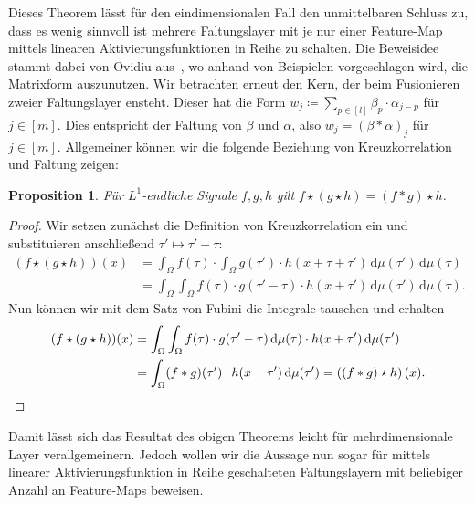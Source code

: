 \documentclass[paper=a4, 	%
		fontsize=11pt, 		%
		abstracton, 	%
		headsepline, 	%
		notitlepage	%
		]{scrartcl}
\newtheorem{proposition}[theorem]{Proposition}
\theoremstyle{definition}
\newcommand{\diff}{\,\textrm{d}}
\newcommand{\fNat}[1]{[ #1 ]}
\begin{document}
Dieses Theorem lässt für den eindimensionalen Fall den unmittelbaren Schluss zu, dass es wenig sinnvoll ist mehrere Faltungslayer mit je nur einer Feature-Map mittels linearen Aktivierungsfunktionen in Reihe zu schalten.
Die Beweisidee stammt dabei von Ovidiu aus~\cite{Calin2020}, wo anhand von Beispielen vorgeschlagen wird, die Matrixform auszunutzen.
Wir betrachten erneut den Kern, der beim Fusionieren zweier Faltungslayer ensteht.
Dieser hat die Form $w_j \coloneqq \sum_{p\in\fNat{l}} \beta_p \cdot \alpha_{j-p}$ für $j\in\fNat{m}$.
Dies entspricht der Faltung von $\beta$ und $\alpha$, also $w_j = (\beta * \alpha)_j$ für $j\in\fNat{m}$.
Allgemeiner können wir die folgende Beziehung von Kreuzkorrelation und Faltung zeigen:
\begin{proposition}\label{prop:associativity-cross-corr}
    Für $L^1$-endliche Signale $f,g,h$ gilt $f\star (g \star h) = (f*g)\star h$.
\end{proposition}
\begin{proof}
    Wir setzen zunächst die Definition von Kreuzkorrelation ein und substituieren anschließend $\tau' \mapsto \tau' - \tau$:
    \begin{align*}
        (f\star (g\star h))(x)
        &= \int_\Omega f(\tau) \cdot \int_\Omega g(\tau') \cdot h(x+\tau+\tau')\diff\mu(\tau') \diff \mu(\tau) \\
        &= \int_\Omega \int_\Omega f(\tau) \cdot g(\tau' - \tau)\cdot h(x+\tau')\diff\mu(\tau') \diff \mu(\tau).
    \end{align*}
    Nun können wir mit dem Satz von Fubini die Integrale tauschen und erhalten
    \begin{align*}
        (f\star (g\star h))(x)&= \int_\Omega\int_\Omega f(\tau) \cdot g(\tau'-\tau) \diff\mu(\tau) \cdot h(x+\tau')\diff\mu(\tau') \\
        &= \int_\Omega  (f * g)(\tau')\cdot h(x+\tau') \diff \mu(\tau')
        = \left( (f * g) \star h \right)(x).\qedhere
    \end{align*}
\end{proof}

Damit lässt sich das Resultat des obigen Theorems leicht für mehrdimensionale Layer verallgemeinern.
Jedoch wollen wir die Aussage nun sogar für mittels linearer Aktivierungsfunktion in Reihe geschalteten Faltungslayern mit beliebiger Anzahl an Feature-Maps beweisen.
\end{document}
